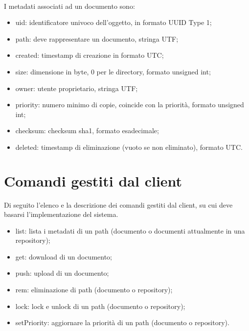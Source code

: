 \documentclass[11pt,a4paper,english]{article}
\begin{document}
\paragraph{} I metadati associati ad un documento sono: 

\begin{itemize}
	\item uid: identificatore univoco dell'oggetto, in formato UUID Type 1;
	\item path: deve rappresentare un documento, stringa UTF;
	\item created: timestamp di creazione in formato UTC;
	\item size: dimensione in byte, 0 per le directory, formato unsigned int;
	\item owner: utente proprietario, stringa UTF;
	\item priority: numero minimo di copie, coincide con la priorità, formato unsigned int;
	\item checksum: checksum sha1, formato esadecimale;
	\item deleted: timestamp di eliminazione (vuoto se non eliminato), formato UTC.
\end{itemize}


\section{Comandi gestiti dal client}

\paragraph{} Di seguito l'elenco e la descrizione dei comandi gestiti dal client, su cui deve basarsi l'implementazione del sistema.

\begin{itemize}
	\item list: lista i metadati di un path (documento o documenti attualmente in una repository);
	
	\item get: download di un documento;
	
	\item push: upload di un documento;
	
	\item rem: eliminazione di path (documento o repository);
	
	\item lock: lock e unlock di un path (documento o repository);
	
	\item setPriority: aggiornare la priorità di un path (documento o repository).
\end{itemize}
\end{document}
